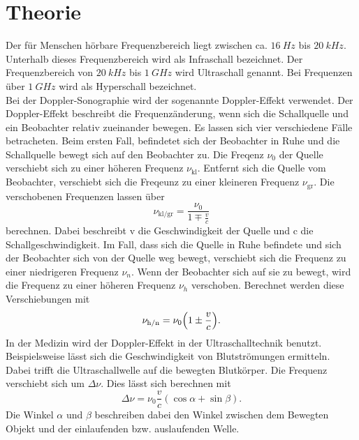 \section{Theorie}
\label{sec:Theorie}
Der für Menschen hörbare Frequenzbereich liegt zwischen ca. $\qty{16}{Hz}$ bis $\qty{20}{kHz}$.
Unterhalb dieses Frequenzbereich wird als Infraschall bezeichnet.
Der Frequenzbereich von $\qty{20}{kHz}$ bis $\qty{1}{GHz}$ wird Ultraschall genannt.
Bei Frequenzen über $\qty{1}{GHz}$ wird als Hyperschall bezeichnet.\\


\noindent Bei der Doppler-Sonographie wird der sogenannte Doppler-Effekt verwendet.
Der Doppler-Effekt beschreibt die Frequenzänderung, wenn sich die Schallquelle und ein Beobachter relativ zueinander bewegen.
Es lassen sich vier verschiedene Fälle betracheten.
Beim ersten Fall, befindetet sich der Beobachter in Ruhe und die Schallquelle bewegt sich auf den Beobachter zu.
Die Freqenz $\nu_0$ der Quelle verschiebt sich zu einer höheren Frequenz $\nu_\text{kl}$.
Entfernt sich die Quelle vom Beobachter, verschiebt sich die Freqeunz zu einer kleineren Frequenz $\nu_\text{gr}$.
Die verschobenen Frequenzen lassen über 
\begin{equation}
    \label{eq:vklgr}
    \nu_\text{kl/gr} = \frac{\nu_0}{1 \mp \frac{v}{c}}
\end{equation}
berechnen.
Dabei beschreibt v die Geschwindigkeit der Quelle und c die Schallgeschwindigkeit.
Im Fall, dass sich die Quelle in Ruhe befindete und sich der Beobachter sich von der Quelle weg bewegt, verschiebt sich die Frequenz zu einer niedrigeren
Frequenz $\nu_n$.
Wenn der Beobachter sich auf sie zu bewegt, wird die Frequenz zu einer höheren Frequenz $\nu_h$ verschoben.
Berechnet werden diese Verschiebungen mit 
\begin{equation}
    \label{eq:vhn}
    \nu_\text{h/n} = \nu_0 \Bigl(1 \pm \frac{v}{c}\Bigr).
\end{equation}
In der Medizin wird der Doppler-Effekt in der Ultraschalltechnik benutzt.
Beispielsweise lässt sich die Geschwindigkeit von Blutströmungen ermitteln.
Dabei trifft die Ultraschallwelle auf die bewegten Blutkörper.
Die Frequenz verschiebt sich um $\Delta \nu$.
Dies lässt sich berechnen mit 
\begin{equation}
    \label{eq:deltav}
    \Delta \nu = \nu_0 \frac{v}{c}(\cos \alpha + \sin \beta).
\end{equation}
Die Winkel $\alpha$ und $\beta$ beschreiben dabei den Winkel zwischen dem Bewegten Objekt und der einlaufenden bzw. auslaufenden Welle.
